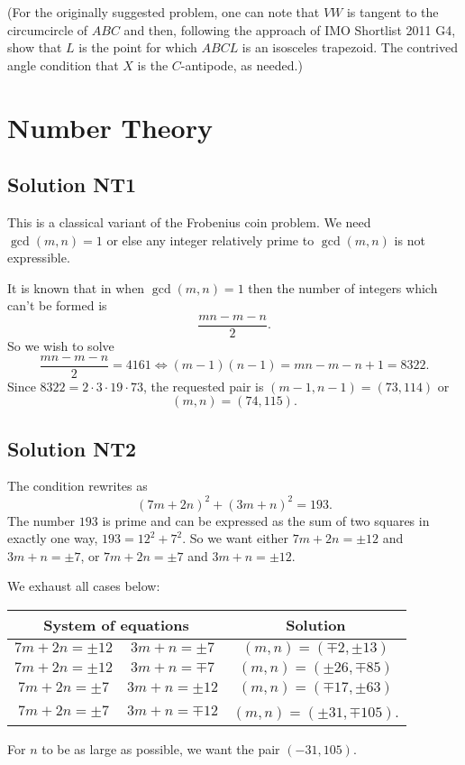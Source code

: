 \documentclass[11pt]{scrartcl}
\begin{document}
(For the originally suggested problem,
one can note that $VW$ is tangent to the circumcircle of $ABC$
and then, following the approach of IMO Shortlist 2011 G4,
show that $L$ is the point for which $ABCL$ is an isosceles trapezoid.
The contrived angle condition that $X$ is the $C$-antipode, as needed.)


\section{Number Theory}
\subsection*{Solution NT1}
This is a classical variant of the Frobenius coin problem.
We need $\gcd(m,n) = 1$ or else any integer
relatively prime to $\gcd(m,n)$ is not expressible.

It is known that in when $\gcd(m,n) = 1$
then the number of integers which can't be formed is
\[ \frac{mn-m-n}{2}. \]
So we wish to solve
\[ \frac{mn-m-n}{2} = 4161
	\iff (m-1)(n-1) = mn - m - n + 1 = 8322. \]
Since $8322 = 2 \cdot 3 \cdot 19 \cdot 73$,
the requested pair is $(m-1, n-1) = (73, 114)$
or \[ (m,n) = (74,115). \]

\subsection*{Solution NT2}
The condition rewrites as
\[ (7m+2n)^2 + (3m+n)^2 = 193. \]
The number $193$ is prime and can be expressed as the sum of two squares
in exactly one way, $193 = 12^2+7^2$.
So we want either $7m+2n = \pm 12$ and $3m+n = \pm 7$,
or $7m+2n = \pm 7$ and $3m+n = \pm 12$.

We exhaust all cases below:
\begin{center}
\begin{tabular}[h]{ccc}
	\multicolumn{2}{c}{System of equations} & Solution \\ \hline
	$7m+2n = \pm12$ & $3m+n = \pm7$ & $(m,n) = \left( \mp 2, \pm 13 \right)$ \\
	$7m+2n = \pm12$ & $3m+n = \mp7$ & $(m,n) = \left( \pm 26, \mp 85 \right)$ \\
	$7m+2n = \pm7$ & $3m+n = \pm12$ & $(m,n) = \left( \mp17, \pm63 \right)$ \\
	$7m+2n = \pm7$ & $3m+n = \mp12$ & $(m,n) = \left( \pm31, \mp105 \right)$.
\end{tabular}
\end{center}
For $n$ to be as large as possible, we want the pair $(-31, 105)$.
\end{document}
